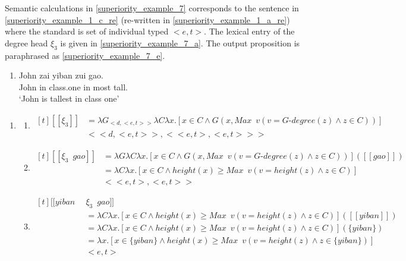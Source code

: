 \documentclass{ctexart}
\begin{document}
Semantic calculations in \ref{superiority_example_7} corresponds to the sentence in \ref{superiority_example_1_c_re} (re-written in \ref{superiority_example_1_a_re}) where the standard is set of individual typed $<e,t>$. The lexical entry of the degree head $\xi_3$ is given in \ref{superiority_example_7_a}. The output proposition is paraphrased as \ref{superiority_example_7_e}.

\begin{enumerate}
    \item \label{superiority_example_1_c_re}
    John zai yiban zui gao. \\
    John in class.one in most tall. \\
    `John is tallest in class one' 
\end{enumerate}

\begin{enumerate}
    \item \label{superiority_example_7}
    \begin{enumerate}
        \item \label{superiority_example_7_a}
        $\begin{aligned}[t]
            [\![\xi_3]\!] &= \lambda G_{<d,<e,t>>} \lambda C \lambda x. [x \in C \land G(x,Max \enspace v(v=G \mbox{-} degree(z) \land z \in C))] \\
            & <<d,<e,t>>, <<e,t>,<e,t>>>
        \end{aligned}$

        \item \label{superiority_example_7_b}
        $\begin{aligned}[t]
            [\![\xi_3 \enspace gao]\!] 
            &= \lambda G \lambda C \lambda x.[x \in C \land G(x,Max \enspace v(v=G \mbox{-} degree(z) \land z \in C))]([\![gao]\!]) \\
            &= \lambda C \lambda x.[x \in C \land height(x) \geq Max \enspace v(v=height(z) \land z \in C)] \\ 
            &<<e,t>,<e,t>>
        \end{aligned}$

        \item \label{superiority_example_7_c}
        $\begin{aligned}[t]
            [\![yiban \enspace & \xi_3 \enspace gao]\!] \\
            &= \lambda C \lambda x.[x \in C \land height(x) \geq Max \enspace v(v=height(z) \land z \in C)]([\![yiban]\!]) \\
            &= \lambda C \lambda x.[x \in C \land height(x) \geq Max \enspace v(v=height(z) \land z \in C)](\{yiban\}) \\
            &= \lambda x.[x \in \{yiban \} \land height(x) \geq Max \enspace v(v=height(z) \land z \in \{yiban \})] \\
            & <e,t>
        \end{aligned}$


\end{enumerate}
\end{enumerate}
\end{document}
